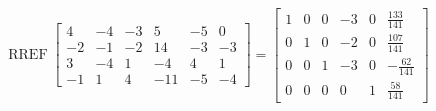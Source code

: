 \begin{exerciseAnswer} 


\[\operatorname{RREF} \left[\begin{array}{cccccc}
4 & -4 & -3 & 5 & -5 & 0 \\
-2 & -1 & -2 & 14 & -3 & -3 \\
3 & -4 & 1 & -4 & 4 & 1 \\
-1 & 1 & 4 & -11 & -5 & -4
\end{array}\right] = \left[\begin{array}{cccccc}
1 & 0 & 0 & -3 & 0 & \frac{133}{141} \\
0 & 1 & 0 & -2 & 0 & \frac{107}{141} \\
0 & 0 & 1 & -3 & 0 & -\frac{62}{141} \\
0 & 0 & 0 & 0 & 1 & \frac{58}{141}
\end{array}\right] \]



\end{exerciseAnswer}
